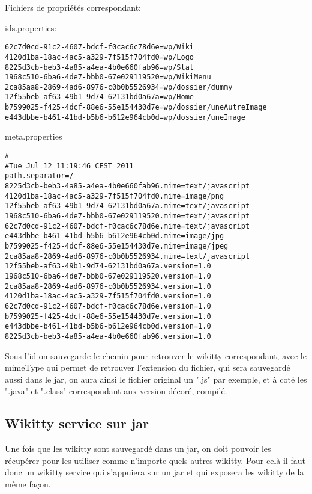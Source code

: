 Fichiers de propriétés correspondant:


ids.properties:
\begin{verbatim}
62c7d0cd-91c2-4607-bdcf-f0cac6c78d6e=wp/Wiki
4120d1ba-18ac-4ac5-a329-7f515f704fd0=wp/Logo
8225d3cb-beb3-4a85-a4ea-4b0e660fab96=wp/Stat
1968c510-6ba6-4de7-bbb0-67e029119520=wp/WikiMenu
2ca85aa8-2869-4ad6-8976-c0b0b5526934=wp/dossier/dummy
12f55beb-af63-49b1-9d74-62131bd0a67a=wp/Home
b7599025-f425-4dcf-88e6-55e154430d7e=wp/dossier/uneAutreImage
e443dbbe-b461-41bd-b5b6-b612e964cb0d=wp/dossier/uneImage
\end{verbatim}


meta.properties
\begin{verbatim}
#
#Tue Jul 12 11:19:46 CEST 2011
path.separator=/
8225d3cb-beb3-4a85-a4ea-4b0e660fab96.mime=text/javascript
4120d1ba-18ac-4ac5-a329-7f515f704fd0.mime=image/png
12f55beb-af63-49b1-9d74-62131bd0a67a.mime=text/javascript
1968c510-6ba6-4de7-bbb0-67e029119520.mime=text/javascript
62c7d0cd-91c2-4607-bdcf-f0cac6c78d6e.mime=text/javascript
e443dbbe-b461-41bd-b5b6-b612e964cb0d.mime=image/jpg
b7599025-f425-4dcf-88e6-55e154430d7e.mime=image/jpeg
2ca85aa8-2869-4ad6-8976-c0b0b5526934.mime=text/javascript
12f55beb-af63-49b1-9d74-62131bd0a67a.version=1.0
1968c510-6ba6-4de7-bbb0-67e029119520.version=1.0
2ca85aa8-2869-4ad6-8976-c0b0b5526934.version=1.0
4120d1ba-18ac-4ac5-a329-7f515f704fd0.version=1.0
62c7d0cd-91c2-4607-bdcf-f0cac6c78d6e.version=1.0
b7599025-f425-4dcf-88e6-55e154430d7e.version=1.0
e443dbbe-b461-41bd-b5b6-b612e964cb0d.version=1.0
8225d3cb-beb3-4a85-a4ea-4b0e660fab96.version=1.0
\end{verbatim}


Sous l'id on sauvegarde le chemin pour retrouver le wikitty correspondant, 
avec le mimeType qui permet de retrouver l'extension du fichier, qui sera sauvegardé
aussi dans le jar, on aura ainsi le fichier original un ".js" par exemple, 
et à coté les ".java" et ".class" correspondant aux version décoré, compilé.


\subsection{Wikitty service sur jar}

Une fois que les wikitty sont sauvegardé dans un jar, on doit pouvoir les 
récupérer pour les utiliser comme n'importe quels autres wikitty. Pour celà il 
faut donc un wikitty service qui s'appuiera sur un jar et qui exposera les 
wikitty de la même façon.

